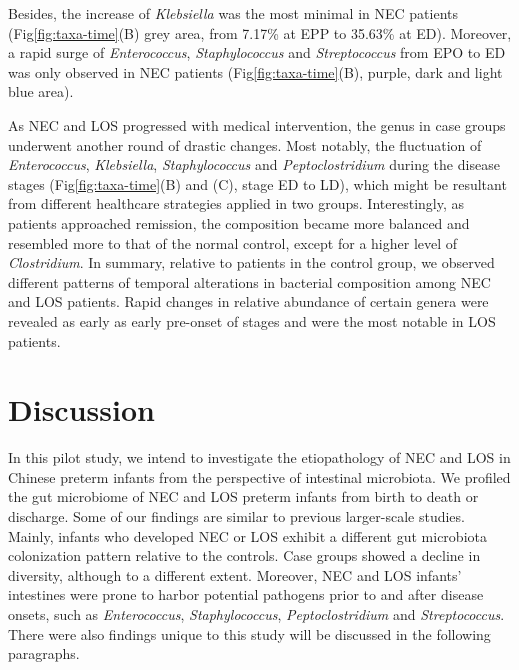 \documentclass[fleqn,10pt, lineno]{wlpeerj} %
\begin{document}
    Besides, the increase of \textit{Klebsiella} was the most minimal in NEC patients (Fig\ref{fig:taxa-time}(B) grey area, from 7.17\% at EPP to 35.63\% at ED).  Moreover, a rapid surge of \textit{Enterococcus}, \textit{Staphylococcus} and \textit{Streptococcus} from EPO to ED was only observed in NEC patients (Fig\ref{fig:taxa-time}(B), purple, dark and light blue area).

  	As NEC and LOS progressed with medical intervention, the genus in case groups underwent another round of drastic changes.  Most notably, the fluctuation of \textit{Enterococcus}, \textit{Klebsiella}, \textit{Staphylococcus} and \textit{Peptoclostridium} during the disease stages (Fig\ref{fig:taxa-time}(B) and (C), stage ED to LD), which might be resultant from different healthcare strategies applied in two groups. Interestingly, as patients approached remission, the composition became more balanced and resembled more to that of the normal control, except for a higher level of \textit{Clostridium}.  In summary, relative to patients in the control group, we observed different patterns of temporal alterations in bacterial composition among NEC and LOS patients. Rapid changes in relative abundance of certain genera were revealed as early as early pre-onset of stages and were the most notable in LOS patients.


\section*{Discussion}
In this pilot study, we intend to investigate the etiopathology of NEC and LOS in Chinese preterm infants from the perspective of intestinal microbiota. We profiled the gut microbiome of NEC and LOS preterm infants from birth to death or discharge. Some of our findings are similar to previous larger-scale studies.  Mainly, infants who developed NEC or LOS exhibit a different gut microbiota colonization pattern relative to the controls. Case groups showed a decline in diversity, although to a different extent. Moreover, NEC and LOS infants' intestines were prone to harbor potential pathogens prior to and after disease onsets, such as \textit{Enterococcus}, \textit{Staphylococcus}, \textit{Peptoclostridium} and \textit{Streptococcus}. There were also findings unique to this study will be discussed in the following paragraphs.
\end{document}
